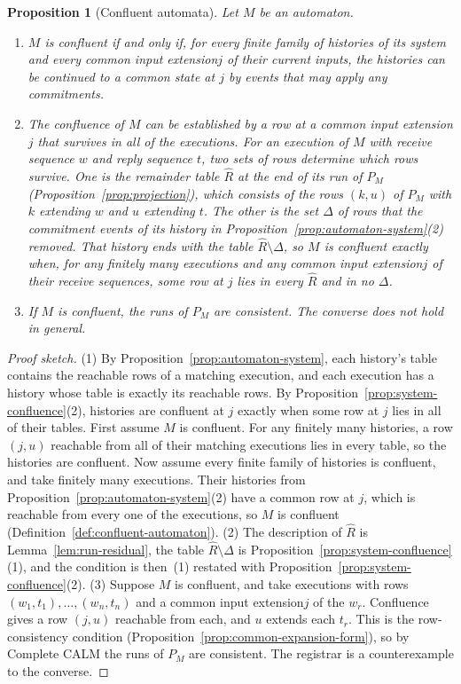 \documentclass[sigconf]{cidr-2027}
\newtheorem{proposition}{Proposition}
\theoremstyle{remark}
\newcommand{\commitment}{commitment\xspace}
\newcommand{\commitments}{commitments\xspace}
\newcommand{\indesc}{input extension\xspace} %
\begin{document}
\begin{proposition}[Confluent automata]
\label{prop:automaton-confluence}
Let $M$ be an automaton.
\begin{enumerate}
\item
$M$ is confluent if and only if, for every finite family of histories
        of its system and every common \indesc $j$ of their current inputs,
        the histories can be continued to a common state at $j$ by events
        that may apply any \commitments.
\item
The confluence of $M$ can be established by a row at a common
        \indesc $j$ that survives in all of the executions. For an execution
        of $M$ with receive sequence $w$ and reply sequence $t$, two sets of
        rows determine which rows survive. One is the remainder table
        $\widehat R$ at the end of its run of $P_M$
        (Proposition~\ref{prop:projection}), which consists of the rows
        $(k,u)$ of $P_M$ with $k$ extending $w$ and $u$ extending $t$. The
        other is the set $\Delta$ of rows that the \commitment events of its
        history in Proposition~\ref{prop:automaton-system}(2) removed. That
        history ends with the table $\widehat R\setminus\Delta$, so $M$ is
        confluent exactly when, for any finitely many executions and any
        common \indesc $j$ of their receive sequences, some row at $j$ lies in
        every $\widehat R$ and in no $\Delta$.
\item
If $M$ is confluent, the runs of $P_M$ are consistent. The converse
        does not hold in general.
\end{enumerate}
\end{proposition}

\begin{proof}[Proof sketch]
(1) By Proposition~\ref{prop:automaton-system}, each history's table contains
the reachable rows of a matching execution, and each execution has a history
whose table is exactly its reachable rows. By
Proposition~\ref{prop:system-confluence}(2), histories are confluent at $j$
exactly when some row at $j$ lies in all of their tables. First assume $M$ is
confluent. For any finitely many histories, a row $(j,u)$ reachable from all
of their matching executions lies in every table, so the histories are
confluent. Now assume every finite family of histories is confluent, and take
finitely many executions. Their histories from
Proposition~\ref{prop:automaton-system}(2) have a common row at $j$, which is
reachable from every one of the executions, so $M$ is confluent
(Definition~\ref{def:confluent-automaton}). (2) The description of
$\widehat R$ is Lemma~\ref{lem:run-residual}, the table $\widehat R\setminus\Delta$
is Proposition~\ref{prop:system-confluence}(1), and the condition is then~(1)
restated with Proposition~\ref{prop:system-confluence}(2). (3) Suppose $M$ is
confluent, and take executions with rows $(w_1,t_1),\ldots,(w_n,t_n)$ and a
common \indesc $j$ of the $w_r$. Confluence gives a row $(j,u)$ reachable from
each, and $u$ extends each $t_r$. This is the row-consistency condition
(Proposition~\ref{prop:common-expansion-form}), so by Complete CALM the runs of
$P_M$ are consistent. The registrar is a counterexample to the converse.
\end{proof}
\end{document}
